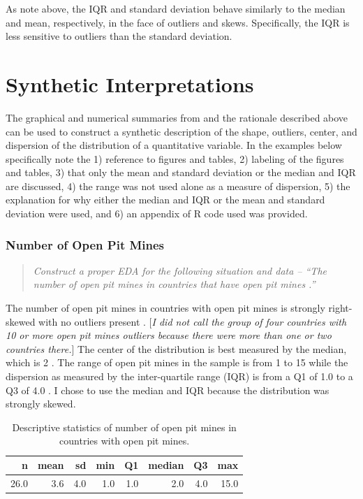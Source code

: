 \documentclass[10pt,openany]{book}\usepackage[]{graphicx}\usepackage[]{color}
\begin{document}
As note above, the IQR and standard deviation behave similarly to the median and mean, respectively, in the face of outliers and skews. Specifically, the IQR is less sensitive to outliers than the standard deviation.


\section{Synthetic Interpretations}
The graphical and numerical summaries from  and the rationale described above can be used to construct a synthetic description of the shape, outliers, center, and dispersion of the distribution of a quantitative variable. In the examples below specifically note the 1) reference to figures and tables, 2) labeling of the figures and tables, 3) that only the mean and standard deviation or the median and IQR are discussed, 4) the range was not used alone as a measure of dispersion, 5) the explanation for why either the median and IQR or the mean and standard deviation were used, and 6) an appendix of R code used was provided.

\subsubsection{Number of Open Pit Mines}
\begin{quote}
\textit{Construct a proper EDA for the following situation and data -- ``The number of open pit mines in countries that have open pit mines .''}
\end{quote}
\vspace{-12pt}

The number of open pit mines in countries with open pit mines is strongly right-skewed with no outliers present . [\textit{I did not call the group of four countries with 10 or more open pit mines outliers because there were more than one or two countries there.}] The center of the distribution is best measured by the median, which is 2 . The range of open pit mines in the sample is from 1 to 15 while the dispersion as measured by the inter-quartile range (IQR) is from a Q1 of 1.0 to a Q3 of  4.0 . I chose to use the median and IQR because the distribution was strongly skewed.

\begin{table}[ht]
\centering
\caption{Descriptive statistics of number of open pit mines in countries with open pit mines.} 
\label{tab:MineStats}
\begin{tabular}{rrrrrrrr}
  \hline
n & mean & sd & min & Q1 & median & Q3 & max \\ 
  \hline
26.0 & 3.6 & 4.0 & 1.0 & 1.0 & 2.0 & 4.0 & 15.0 \\ 
   \hline
\end{tabular}
\end{table}
\end{document}
